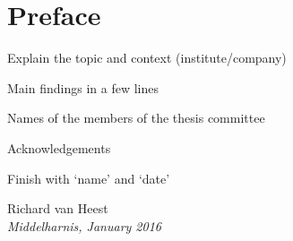 \chapter*{Preface}

\itemize
	\item Explain the topic and context (institute/company)
	\item Main findings in a few lines
	\item Names of the members of the thesis committee
	\item Acknowledgements
	\item Finish with ‘name’ and ‘date’

\begin{flushright}
Richard van Heest\\
\emph{Middelharnis, January 2016}
\end{flushright}